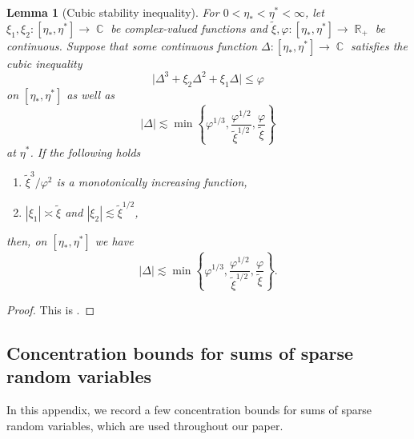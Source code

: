 \documentclass[10pt,a4paper]{amsart}
\DeclareMathOperator{\RR}{\mathbb{R}}
\DeclareMathOperator{\CC}{\mathbb{C}}
\newcommand{\abs}[1]{\left| #1 \right|}
\newtheorem{lemma}{Lemma}[section]
\numberwithin{equation}{section}
\begin{document}
	\begin{lemma}[Cubic stability inequality]\label{lem:stability2}
		For $0 < \eta_{\ast} < \eta^{\ast} < \infty$, let $\xi_1, \xi_2 : [\eta_{\ast}, \eta^{\ast}] \rightarrow \CC$ be complex-valued functions and $\tilde{\xi},\varphi: [\eta_{\ast},\eta^{\ast}] \rightarrow \RR_{+}$ be continuous. Suppose that some continuous function $\Delta : [\eta_{\ast}, \eta^{\ast}] \rightarrow \CC$ satisfies the cubic inequality 
		\begin{equation*}
			\big| \Delta^3 + \xi_2 \Delta^2 + \xi_1 \Delta \big| \le \varphi 
		\end{equation*}
		on $[\eta_{\ast}, \eta^{\ast}]$ as well as 
		\begin{equation*}
			\abs{\Delta} \lesssim \min \left\{ \varphi^{1/3}, \frac{\varphi^{1/2}}{\tilde{\xi}^{1/2}}, \frac{\varphi}{\tilde{\xi}}\right\}
		\end{equation*}
		at $\eta^{\ast}$. If the following holds
		\begin{enumerate}
			\item $\tilde{\xi}^3/\varphi^{2}$ is a monotonically increasing function,
			\item $|\xi_1| \asymp \tilde{\xi}$ and $|\xi_2| \lesssim \tilde{\xi}^{1/2}$,
		\end{enumerate}
		then, on $[\eta_{\ast}, \eta^{\ast}]$ we have 
		\begin{equation*}
			\abs{\Delta} \lesssim  \min\left\{ \varphi^{1/3}, \frac{\varphi^{1/2}}{\tilde{\xi}^{1/2}}, \frac{\varphi}{\tilde{\xi}}\right\}.
		\end{equation*}
	\end{lemma}
	
	\begin{proof} 
	This is {\cite[Lemma~10.3]{e643140142d24edcbb5c1a963fc669bf}}. 
	\end{proof} 
	
	\subsection{Concentration bounds for sums of sparse random variables}
	In this appendix, we record a few concentration bounds for sums of sparse random variables, which are used throughout our paper. 
	
\end{document}
